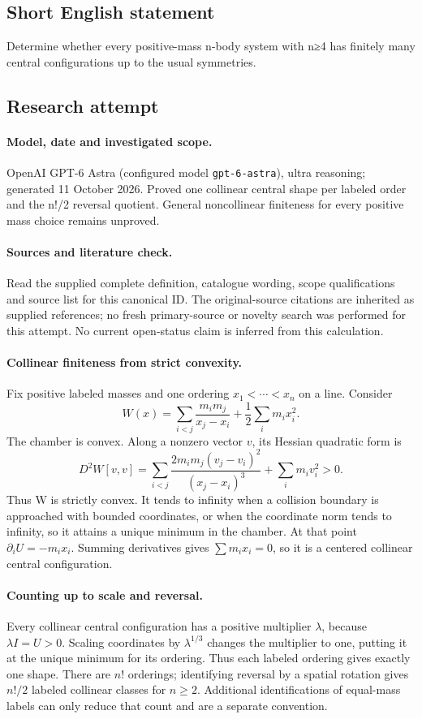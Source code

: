 \documentclass[11pt]{article}
\begin{document}
\subsection{Short English statement}
Determine whether every positive-mass n-body system with n≥4 has finitely many central configurations up to the usual symmetries.
\subsection{Research attempt}
\paragraph{Model, date and investigated scope.}
OpenAI GPT-6 Astra (configured model \texttt{gpt-6-astra}), ultra reasoning; generated 11 October 2026. Proved one collinear central shape per labeled order and the n!/2 reversal quotient. General noncollinear finiteness for every positive mass choice remains unproved.

\paragraph{Sources and literature check.}
Read the supplied complete definition, catalogue wording, scope qualifications and source list for this canonical ID. The original-source citations are inherited as supplied references; no fresh primary-source or novelty search was performed for this attempt. No current open-status claim is inferred from this calculation.

\paragraph{Collinear finiteness from strict convexity.}Fix positive labeled masses and one ordering \(x_1<\cdots<x_n\) on a line. Consider
\[W(x)=\sum_{i<j}\frac{m_im_j}{x_j-x_i}+\frac12\sum_im_ix_i^2.
\]
The chamber is convex. Along a nonzero vector \(v\), its Hessian quadratic form is
\[D^2W[v,v]=\sum_{i<j}\frac{2m_im_j(v_j-v_i)^2}{(x_j-x_i)^3}+\sum_im_iv_i^2>0.
\]
Thus W is strictly convex. It tends to infinity when a collision boundary is approached with bounded coordinates, or when the coordinate norm tends to infinity, so it attains a unique minimum in the chamber. At that point \(\partial_iU=-m_ix_i\). Summing derivatives gives \(\sum m_ix_i=0\), so it is a centered collinear central configuration.
\paragraph{Counting up to scale and reversal.}Every collinear central configuration has a positive multiplier \(\lambda\), because \(\lambda I=U>0\). Scaling coordinates by \(\lambda^{1/3}\) changes the multiplier to one, putting it at the unique minimum for its ordering. Thus each labeled ordering gives exactly one shape. There are \(n!\) orderings; identifying reversal by a spatial rotation gives \(n!/2\) labeled collinear classes for \(n\ge2\). Additional identifications of equal-mass labels can only reduce that count and are a separate convention.
\end{document}
